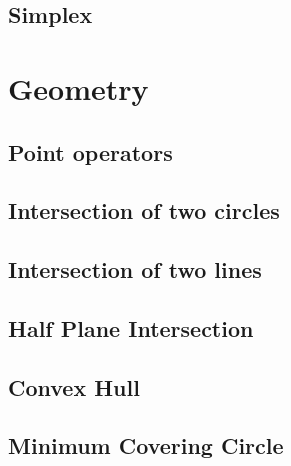 \documentclass[10pt,twocolumn,oneside]{article}
\begin{document}
\subsection{Simplex}


\newpage

\section{Geometry}
\subsection{Point operators}


\subsection{Intersection of two circles}



\subsection{Intersection of two lines}


\subsection{Half Plane Intersection}


%

\subsection{Convex Hull}


\subsection{Minimum Covering Circle}

\end{document}

